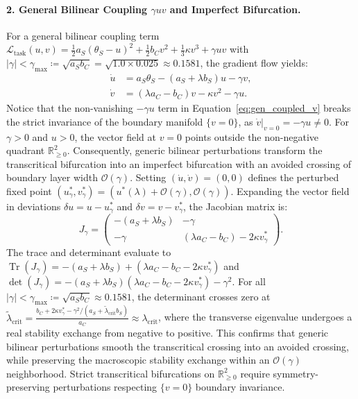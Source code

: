 \documentclass{article}
\theoremstyle{plain}
\theoremstyle{definition}
\DeclareMathOperator{\Tr}{Tr}
\begin{document}
\paragraph{2. General Bilinear Coupling $\gamma u v$ and Imperfect Bifurcation.}
For a general bilinear coupling term $\mathcal{L}_{\text{task}}(u, v) = \frac{1}{2} a_S (\theta_S - u)^2 + \frac{1}{2} b_C v^2 + \frac{1}{3} \kappa v^3 + \gamma u v$ with $|\gamma| < \gamma_{\text{max}} \coloneqq \sqrt{a_S b_C} = \sqrt{1.0 \times 0.025} \approx 0.1581$, the gradient flow yields:
\begin{align}
    \dot{u} &= a_S \theta_S - (a_S + \lambda b_S) u - \gamma v, \label{eq:gen_coupled_u} \\
    \dot{v} &= (\lambda a_C - b_C) v - \kappa v^2 - \gamma u. \label{eq:gen_coupled_v}
\end{align}
Notice that the non-vanishing $-\gamma u$ term in Equation~\eqref{eq:gen_coupled_v} breaks the strict invariance of the boundary manifold $\{v=0\}$, as $\dot{v}|_{v=0} = -\gamma u \ne 0$. For $\gamma > 0$ and $u > 0$, the vector field at $v = 0$ points outside the non-negative quadrant $\mathbb{R}_{\ge 0}^2$. Consequently, generic bilinear perturbations transform the transcritical bifurcation into an imperfect bifurcation with an avoided crossing of boundary layer width $\mathcal{O}(\gamma)$. Setting $(\dot{u}, \dot{v}) = (0, 0)$ defines the perturbed fixed point $(u^*_\gamma, v^*_\gamma) = (u^*(\lambda) + \mathcal{O}(\gamma), \mathcal{O}(\gamma))$. Expanding the vector field in deviations $\delta u = u - u^*_\gamma$ and $\delta v = v - v^*_\gamma$, the Jacobian matrix is:
\begin{equation}
    J_\gamma = \begin{pmatrix}
        -(a_S + \lambda b_S) & -\gamma \\
        -\gamma & (\lambda a_C - b_C) - 2\kappa v^*_\gamma
    \end{pmatrix}.
\end{equation}
The trace and determinant evaluate to $\Tr(J_\gamma) = -(a_S + \lambda b_S) + (\lambda a_C - b_C - 2\kappa v^*_\gamma)$ and $\det(J_\gamma) = -(a_S + \lambda b_S)(\lambda a_C - b_C - 2\kappa v^*_\gamma) - \gamma^2$. For all $|\gamma| < \gamma_{\text{max}} \coloneqq \sqrt{a_S b_C} \approx 0.1581$, the determinant crosses zero at $\tilde{\lambda}_{\text{crit}} = \frac{b_C + 2\kappa v^*_\gamma - \gamma^2 / (a_S + \tilde{\lambda}_{\text{crit}} b_S)}{a_C} \approx \lambda_{\text{crit}}$, where the transverse eigenvalue undergoes a real stability exchange from negative to positive. This confirms that generic bilinear perturbations smooth the transcritical crossing into an avoided crossing, while preserving the macroscopic stability exchange within an $\mathcal{O}(\gamma)$ neighborhood. Strict transcritical bifurcations on $\mathbb{R}_{\ge 0}^2$ require symmetry-preserving perturbations respecting $\{v=0\}$ boundary invariance.
\end{document}
